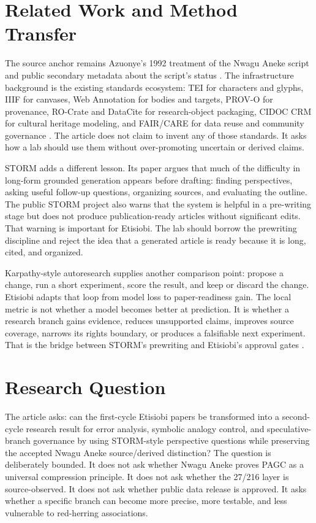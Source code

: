 \documentclass[sigconf,nonacm]{acmart}
\begin{document}
\section{Related Work and Method Transfer}
The source anchor remains Azuonye's 1992 treatment of the Nwagu Aneke script and
public secondary metadata about the script's status \cite{azuonye1992,omniglotNwagu,scriptSourceNwagu,unicodeAfricanScripts2023}.
The infrastructure background is the existing standards ecosystem: TEI for
characters and glyphs, IIIF for canvases, Web Annotation for bodies and targets,
PROV-O for provenance, RO-Crate and DataCite for research-object packaging,
CIDOC CRM for cultural heritage modeling, and FAIR/CARE for data reuse and
community governance \cite{teiP5Glyphs,iiifPresentation3,w3cAnnotationModel,w3cProvO,rocrate12,cidocCrm,datacite45,wilkinson2016fair,carroll2020care}. The article does not claim to invent
any of those standards. It asks how a lab should use them without over-promoting
uncertain or derived claims.

STORM adds a different lesson. Its paper argues that much of the difficulty in
long-form grounded generation appears before drafting: finding perspectives,
asking useful follow-up questions, organizing sources, and evaluating the
outline. The public STORM project also warns that the system is helpful in a
pre-writing stage but does not produce publication-ready articles without
significant edits. That warning is important for Etisiobi. The lab should borrow
the prewriting discipline and reject the idea that a generated article is ready
because it is long, cited, and organized.

Karpathy-style autoresearch supplies another comparison point: propose a change,
run a short experiment, score the result, and keep or discard the change. Etisiobi
adapts that loop from model loss to paper-readiness gain. The local metric is
not whether a model becomes better at prediction. It is whether a research
branch gains evidence, reduces unsupported claims, improves source coverage,
narrows its rights boundary, or produces a falsifiable next experiment. That is
the bridge between STORM's prewriting and Etisiobi's approval gates
\cite{karpathyAutoresearch,shao2024storm,jiang2024costorm}.

\section{Research Question}
The article asks: can the first-cycle Etisiobi papers be transformed into a
second-cycle research result for error analysis, symbolic analogy control, and speculative-branch governance by using STORM-style perspective
questions while preserving the accepted Nwagu Aneke source/derived distinction?
The question is deliberately bounded. It does not ask whether Nwagu Aneke proves
PAGC as a universal compression principle. It does not ask whether the 27/216
layer is source-observed. It does not ask whether public data release is
approved. It asks whether a specific branch can become more precise, more
testable, and less vulnerable to red-herring associations.
\end{document}
